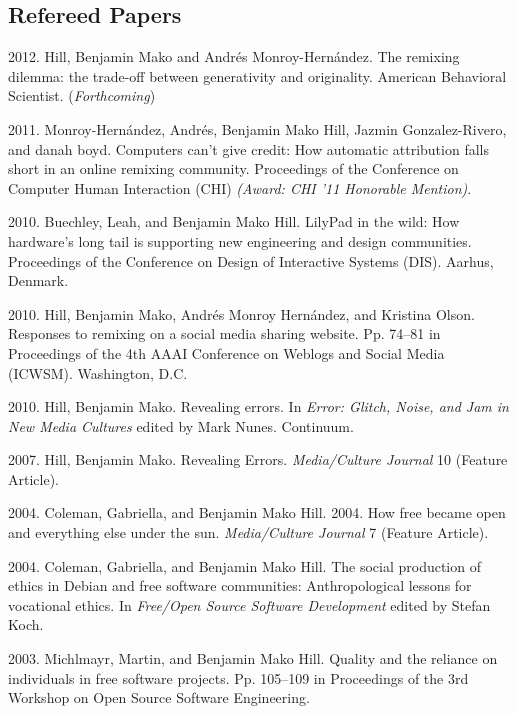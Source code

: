 \documentclass[10pt]{article}
\newenvironment{cvlist}{
\begin{list}{}{\leftmargin=3.0em \itemindent=-3.0em}
  \setlength{\itemsep}{0pt}
  \setlength{\parskip}{0em}
  \setlength{\parsep}{1em}
  \setlength{\parindent}{0em}}
{\vspace{1em}
\end{list}}
\begin{document}
\subsection{Refereed Papers}
\begin{cvlist}
\item 2012. Hill, Benjamin Mako and Andrés Monroy-Hernández.
  The remixing dilemma: the trade-off between generativity and
  originality. American Behavioral Scientist. (\emph{Forthcoming})
\item 2011. Monroy-Hernández, Andrés, Benjamin Mako Hill, Jazmin
  Gonzalez-Rivero, and danah boyd. Computers can't give credit: How
  automatic attribution falls short in an online remixing
  community. Proceedings of the Conference on Computer Human
  Interaction (CHI) \emph{(Award: CHI '11 Honorable Mention)}.
\item 2010. Buechley, Leah, and Benjamin Mako Hill. LilyPad in the wild:
  How hardware's long tail is supporting new engineering and design
  communities. Proceedings of the Conference on Design of Interactive
  Systems (DIS). Aarhus, Denmark.
\item 2010. Hill, Benjamin Mako, Andrés Monroy Hernández, and Kristina
  Olson. Responses to remixing on a social media sharing
  website. Pp. 74--81 in Proceedings of the 4th AAAI Conference on
  Weblogs and Social Media (ICWSM). Washington, D.C.
\item 2010. Hill, Benjamin Mako. Revealing errors. In \emph{Error:
    Glitch, Noise, and Jam in New Media Cultures} edited by Mark
  Nunes. Continuum. %
\item 2007. Hill, Benjamin Mako. Revealing Errors. \emph{Media/Culture
    Journal} 10 (Feature Article).
\item 2004. Coleman, Gabriella, and Benjamin Mako Hill. 2004. How free
  became open and everything else under the sun. \emph{Media/Culture
    Journal} 7 (Feature Article).
\item 2004. Coleman, Gabriella, and Benjamin Mako Hill. The social
  production of ethics in Debian and free software communities:
  Anthropological lessons for vocational ethics. In \emph{Free/Open
    Source Software Development} edited by Stefan Koch.
\item 2003. Michlmayr, Martin, and Benjamin Mako Hill. Quality and the
  reliance on individuals in free software projects. Pp. 105--109 in
  Proceedings of the 3rd Workshop on Open Source Software Engineering.
\end{cvlist}
\end{document}

